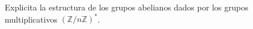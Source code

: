 \question
Explicita la estructura de los grupos abelianos dados por los grupos multiplicativos 
$(\mathbb{Z}/n\mathbb{Z})^*$.